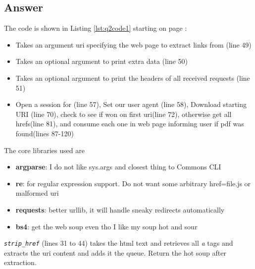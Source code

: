 \documentclass[letterpaper,10pt]{article}
\begin{document}
\subsection*{Answer}


  
The code is shown in Listing \ref{lst:q2code1} starting on page \pageref{lst:q2code1}:
\begin{itemize}
\item Takes an argument uri specifying the web page to extract links from (line 49)
\item Takes an optional argument to print extra data (line 50)
\item Takes an optional argument to print the headers of all received requests (line 51)
\item Open a session for (line 57), Set our user agent (line 58), Download starting URI (line 70), check to see if won on first uri(line 72), otherwise get all hrefs(line 81), and consume each one in web page informing user if pdf was found(lines 87-120)
\end{itemize}
\noindent
The core libraries used are
\begin{itemize}
\item \textbf{argparse}: I do not like sys.args and closest thing to Commons CLI
\item \textbf{re}: for regular expression support. Do not want some arbitrary href=file.js or malformed uri
\item \textbf{requests}: better urllib, it will handle sneaky redirects automatically   
\item \textbf{bs4}: get the web soup even tho I like my soup hot and sour 
\end{itemize}  
\noindent
\emph{\texttt{strip\_href}} (lines 31 to 44) takes the html text and retrieves all \emph{a} tags and extracts the uri content and adds it the queue. Return the hot soup after extraction.
\newline 
\end{document}
